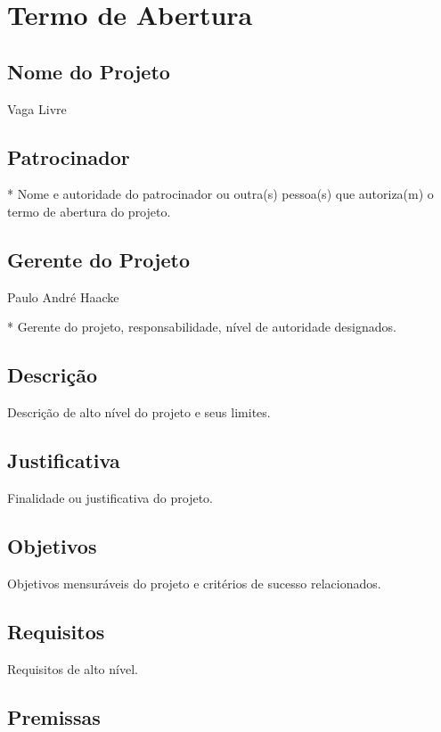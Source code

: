 \section{Termo de Abertura}

\subsection{Nome do Projeto}

Vaga Livre

\subsection{Patrocinador}

* Nome e autoridade do patrocinador ou outra(s) pessoa(s) que autoriza(m) o termo de abertura do projeto.

\subsection{Gerente do Projeto}

Paulo André Haacke

* Gerente do projeto, responsabilidade, nível de autoridade designados.

\subsection{Descrição}

Descrição de alto nível do projeto e seus limites.

\subsection{Justificativa}

Finalidade ou justificativa do projeto.

\subsection{Objetivos}

Objetivos mensuráveis do projeto e critérios de sucesso relacionados.

\subsection{Requisitos}

Requisitos de alto nível.

\subsection{Premissas}

